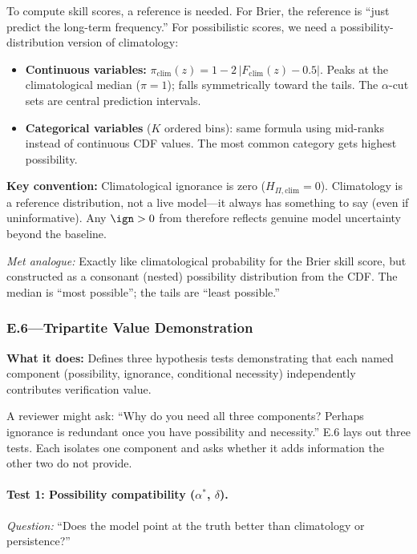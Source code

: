 To compute skill scores, a reference is needed. For Brier, the reference is ``just predict the long-term frequency.'' For possibilistic scores, we need a possibility-distribution version of climatology:

\begin{itemize}[leftmargin=2em]
\item \textbf{Continuous variables:} $\pi_{\mathrm{clim}}(z) = 1 - 2\,|F_{\mathrm{clim}}(z) - 0.5|$. Peaks at the climatological median ($\pi = 1$); falls symmetrically toward the tails. The $\alpha$-cut sets are central prediction intervals.
\item \textbf{Categorical variables} ($K$ ordered bins): same formula using mid-ranks instead of continuous CDF values. The most common category gets highest possibility.
\end{itemize}

\textbf{Key convention:} Climatological ignorance is zero ($H_{\Pi,\mathrm{clim}} = 0$). Climatology is a reference distribution, not a live model---it always has something to say (even if uninformative). Any $\ign > 0$ from \clyfar{} therefore reflects genuine model uncertainty beyond the baseline.

\textit{Met analogue:} Exactly like climatological probability for the Brier skill score, but constructed as a consonant (nested) possibility distribution from the CDF. The median is ``most possible''; the tails are ``least possible.''

\subsubsection{E.6---Tripartite Value Demonstration}\label{sec:plain_e6}

\textbf{What it does:} Defines three hypothesis tests demonstrating that each named component (possibility, ignorance, conditional necessity) independently contributes verification value.

A reviewer might ask: ``Why do you need all three components? Perhaps ignorance is redundant once you have possibility and necessity.'' E.6 lays out three tests. Each isolates one component and asks whether it adds information the other two do not provide.

\paragraph{Test 1: Possibility compatibility ($\alpha^*$, $\delta$).}
\textit{Question:} ``Does the model point at the truth better than climatology or persistence?''

